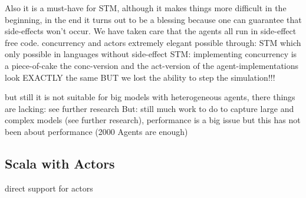 Also it is a must-have for STM, although it makes things more difficult in the beginning, in the end it turns out to be a blessing because one can guarantee that side-effects won't occur. We have taken care that the agents all run in side-effect free code.
concurrency and actors extremely elegant possible through: STM which only possible in languages without side-effect	
STM: implementing concurrency is a piece-of-cake
the conc-version and the act-version of the agent-implementations look EXACTLY the same	 BUT we lost the ability to step the simulation!!!

but still it is not suitable for big models with heterogeneous agents, there things are lacking: see further research
But: still much work to do to capture large and complex models (see further research), performance is a big issue but this has not been about performance (2000 Agents are enough)

\subsection{Scala with Actors}
direct support for actors